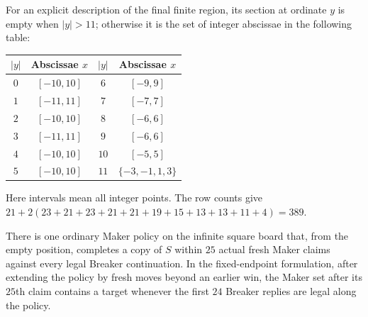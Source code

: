 For an explicit description of the final finite region, its section
at ordinate $y$ is empty when $|y|>11$; otherwise it is the set of
integer abscissae in the following table:
\begin{center}
\begin{tabular}{c|c@{\qquad}c|c}
\toprule
$|y|$&Abscissae $x$&$|y|$&Abscissae $x$\\
\midrule
$0$&$[-10,10]$&$6$&$[-9,9]$\\
$1$&$[-11,11]$&$7$&$[-7,7]$\\
$2$&$[-10,10]$&$8$&$[-6,6]$\\
$3$&$[-11,11]$&$9$&$[-6,6]$\\
$4$&$[-10,10]$&$10$&$[-5,5]$\\
$5$&$[-10,10]$&$11$&$\{-3,-1,1,3\}$\\
\bottomrule
\end{tabular}
\end{center}
Here intervals mean all integer points.  The row counts give
$21+2(23+21+23+21+21+19+15+13+13+11+4)=389$.

\begin{proposition}\label{r25:bound}
There is one ordinary Maker policy on the infinite square board that,
from the empty position, completes a copy of $S$ within $25$ actual
fresh Maker claims against every legal Breaker continuation.  In the
fixed-endpoint formulation, after extending the policy by fresh moves
beyond an earlier win, the Maker set after its $25$th claim contains
a target whenever the first $24$ Breaker replies are legal along the
policy.
\end{proposition}


